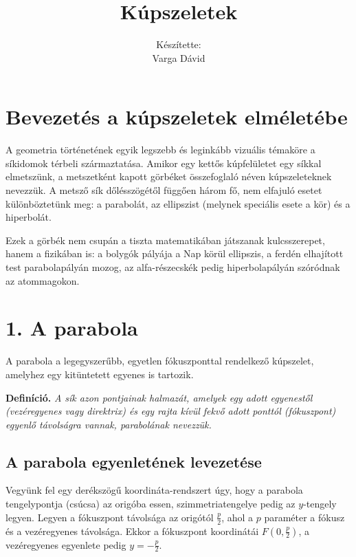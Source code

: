 \documentclass[12pt, a4paper]{article}
\newcommand{\textbfr}[1]{\textbf{\textcolor{bvred}{#1}}}
\begin{document}
\title{\textbfr{Kúpszeletek}}
\author{Készítette:\\Varga Dávid}
\date{}
\maketitle

\section*{Bevezetés a kúpszeletek elméletébe}

A geometria történetének egyik legszebb és leginkább vizuális témaköre a síkidomok térbeli származtatása. Amikor egy kettős kúpfelületet egy síkkal elmetszünk, a metszetként kapott görbéket összefoglaló néven kúpszeleteknek nevezzük. A metsző sík dőlésszögétől függően három fő, nem elfajuló esetet különböztetünk meg: a parabolát, az ellipszist (melynek speciális esete a kör) és a hiperbolát. 

Ezek a görbék nem csupán a tiszta matematikában játszanak kulcsszerepet, hanem a fizikában is: a bolygók pályája a Nap körül ellipszis, a ferdén elhajított test parabolapályán mozog, az alfa-részecskék pedig hiperbolapályán szóródnak az atommagokon.

\section*{1. A parabola}

A parabola a legegyszerűbb, egyetlen fókuszponttal rendelkező kúpszelet, amelyhez egy kitüntetett egyenes is tartozik.

\textbf{Definíció.} \textit{A sík azon pontjainak halmazát, amelyek egy adott egyenestől (vezéregyenes vagy direktrix) és egy rajta kívül fekvő adott ponttól (fókuszpont) egyenlő távolságra vannak, \textcolor{bvred}{parabolának} nevezzük.}

\subsection*{A parabola egyenletének levezetése}

Vegyünk fel egy derékszögű koordináta-rendszert úgy, hogy a parabola tengelypontja (csúcsa) az origóba essen, szimmetriatengelye pedig az $y$-tengely legyen. Legyen a fókuszpont távolsága az origótól $\frac{p}{2}$, ahol a $p$ paraméter a fókusz és a vezéregyenes távolsága. Ekkor a fókuszpont koordinátái $F\left(0, \frac{p}{2}\right)$, a vezéregyenes egyenlete pedig $y = -\frac{p}{2}$.
\end{document}
